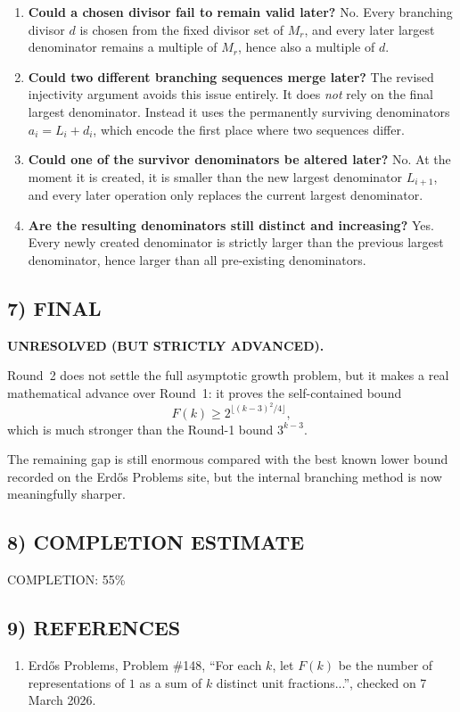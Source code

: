 \begin{enumerate}
\item \textbf{Could a chosen divisor fail to remain valid later?} No. Every branching divisor $d$ is chosen from the fixed divisor set of $M_r$, and every later largest denominator remains a multiple of $M_r$, hence also a multiple of $d$.
\item \textbf{Could two different branching sequences merge later?} The revised injectivity argument avoids this issue entirely. It does \emph{not} rely on the final largest denominator. Instead it uses the permanently surviving denominators $a_i=L_i+d_i$, which encode the first place where two sequences differ.
\item \textbf{Could one of the survivor denominators be altered later?} No. At the moment it is created, it is smaller than the new largest denominator $L_{i+1}$, and every later operation only replaces the current largest denominator.
\item \textbf{Are the resulting denominators still distinct and increasing?} Yes. Every newly created denominator is strictly larger than the previous largest denominator, hence larger than all pre-existing denominators.
\end{enumerate}

\subsection*{7) FINAL}
\textbf{UNRESOLVED (BUT STRICTLY ADVANCED).}

Round~2 does not settle the full asymptotic growth problem, but it makes a real mathematical advance over Round~1: it proves the self-contained bound
\[
F(k)\ge 2^{\lfloor (k-3)^2/4\rfloor},
\]
which is much stronger than the Round-1 bound $3^{k-3}$.

The remaining gap is still enormous compared with the best known lower bound recorded on the Erd\H{o}s Problems site, but the internal branching method is now meaningfully sharper.

\subsection*{8) COMPLETION ESTIMATE}
COMPLETION: 55\%

\subsection*{9) REFERENCES}
\begin{enumerate}
\item Erd\H{o}s Problems, Problem \#148, ``For each $k$, let $F(k)$ be the number of representations of $1$ as a sum of $k$ distinct unit fractions...'', checked on 7 March 2026.
\end{enumerate}

